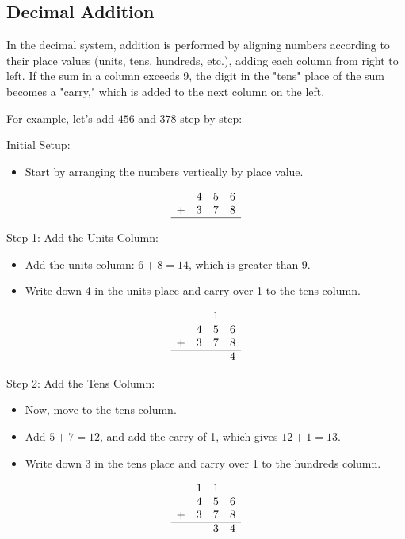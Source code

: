 \subsection{Decimal Addition}
In the decimal system, addition is performed by aligning numbers according to their place values (units, tens, hundreds, etc.), adding each column from right to left. If the sum in a column exceeds 9, the digit in the "tens" place of the sum becomes a "carry," which is added to the next column on the left.
\vspace{\baselineskip}\par
For example, let's add \( 456 \) and \( 378 \) step-by-step:
\vspace{\baselineskip}\par
Initial Setup:
  \begin{itemize}
       \item  Start by arranging the numbers vertically by place value.
   \end{itemize}
\[
\begin{array}{cccc}
    & 4 & 5 & 6 \\
  + & 3 & 7 & 8 \\
  \hline
\end{array}
\]

\vspace{\baselineskip}\par
Step 1: Add the Units Column:
   \begin{itemize}
       \item Add the units column: \( 6 + 8 = 14 \), which is greater than 9.
       \item Write down 4 in the units place and carry over 1 to the tens column.
   \end{itemize}
\[
\begin{array}{cccc}
    & & 1 & \\ %
    & 4 & 5 & 6 \\
  + & 3 & 7 & 8 \\
  \hline
    & & & 4 \\
\end{array}
\]

\vspace{\baselineskip}\par
Step 2: Add the Tens Column:
  \begin{itemize}
       \item Now, move to the tens column.
       \item Add \( 5 + 7 = 12 \), and add the carry of 1, which gives \( 12 + 1 = 13 \).
       \item Write down 3 in the tens place and carry over 1 to the hundreds column.
   \end{itemize}
\[
\begin{array}{cccc}
    & 1 & 1 & \\ %
    & 4 & 5 & 6 \\
  + & 3 & 7 & 8 \\
  \hline
    & & 3 & 4 \\
\end{array}
\]

